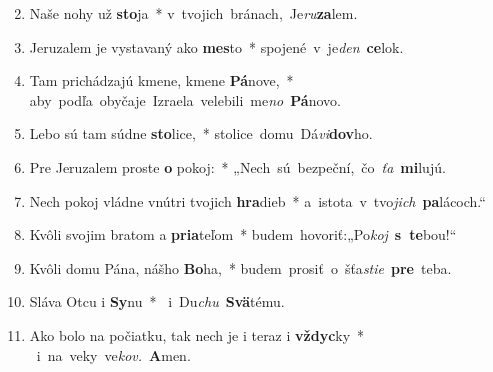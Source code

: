 \begin{flushleft}
\begin{enumerate}[leftmargin=*]
\setcounter{enumi}{1}
\item Naše nohy už \textbf{sto}ja~* \mbox{v tvojich bránach, Je\textit{ru}\textbf{za}lem.}
\item Jeruzalem je vystavaný ako \textbf{mes}to~* \mbox{spojené v je\textit{den} \textbf{ce}lok.}
\item Tam prichádzajú kmene, kmene \textbf{Pá}nove,~* \mbox{aby podľa obyčaje Izraela velebili me\textit{no} \textbf{Pá}novo.}
\item Lebo sú tam súdne \textbf{sto}lice,~* \mbox{stolice domu Dá\textit{vi}\textbf{dov}ho.}
\item Pre Jeruzalem proste \textbf{o} pokoj:~* \mbox{„Nech sú bezpeční, čo \textit{ťa} \textbf{mi}lujú.}
\item Nech pokoj vládne vnútri tvojich \textbf{hra}dieb~* \mbox{a istota v tvo\textit{jich} \textbf{pa}lácoch.“}
\item Kvôli svojim bratom a \textbf{pria}teľom~* \mbox{budem hovoriť:„Po\textit{koj} \textbf{s te}bou!“}
\item Kvôli domu Pána, nášho \textbf{Bo}ha,~* \mbox{budem prosiť o šťa\textit{stie} \textbf{pre} teba.}
\item Sláva Otcu i \textbf{Sy}nu~* \mbox{ i Du\textit{chu} \textbf{Svä}tému.}
\item Ako bolo na počiatku, tak nech je i teraz i \textbf{vždyc}ky~* \mbox{ i na veky ve\textit{kov.} \textbf{A}men.}\end{enumerate}
\end{flushleft}

